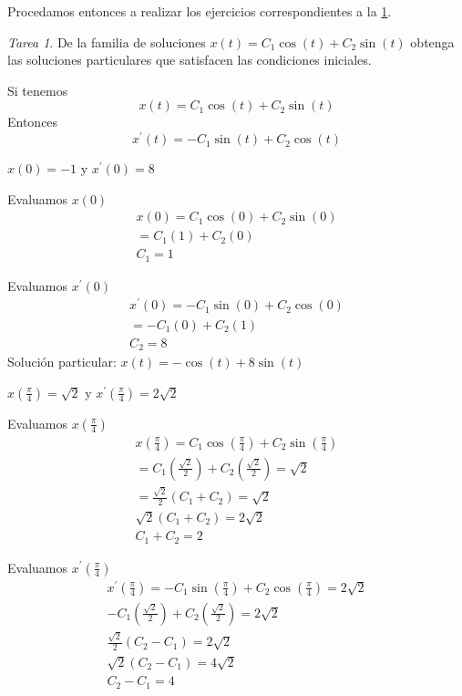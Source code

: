 \documentclass[12pt]{article} %
\theoremstyle{remark} %
\newtheorem{tarea}{Tarea}[section] %
\newcounter{ejercicio}[tarea]
\begin{document}
Procedamos entonces a realizar los ejercicios correspondientes a la \cref{tarea:familiaSoluciones}.
\begin{tarea}\label{tarea:familiaSoluciones}
De la familia de soluciones $x(t) = C_1 \cos(t) + C_2 \sin(t)$ obtenga las 
soluciones particulares que satisfacen las condiciones iniciales.

Si tenemos \[ x(t) = C_1 \cos(t) + C_2 \sin(t) \]
Entonces \[ x^{\prime}(t) = -C_1 \sin(t) + C_2 \cos(t) \]
\begin{ejercicio}
  $x(0) = -1$ y $x^{\prime}(0) = 8$

  Evaluamos $x(0)$
  \begin{gather*}
    x(0) = C_1 \cos(0) + C_2 \sin(0)\\[0.5em]
    = C_1(1) + C_2(0)\\[0.5em]
    C_1  = 1
  \end{gather*}

  Evaluamos $x^{\prime}(0)$
  \begin{gather*}
    x^{\prime}(0) = -C_1 \sin(0) + C_2 \cos(0)\\[0.5em]
    = -C_1(0) + C_2(1)\\[0.5em]
    C_2 = 8
  \end{gather*}
  Solución particular: $x(t) = - \cos(t) + 8 \sin(t)$

\end{ejercicio}
\begin{ejercicio}
  $x(\frac{\pi}{4}) = \sqrt{2}$ y $x^{\prime}(\frac{\pi}{4}) = 2 \sqrt{2}$

  Evaluamos $x(\frac{\pi}{4})$
  \begin{gather*}
    x(\frac{\pi}{4}) = C_1 \cos(\frac{\pi}{4}) + C_2 \sin(\frac{\pi}{4})\\[0.5em]
    = C_1 (\frac{\sqrt{2}}{2}) + C_2 (\frac{\sqrt{2}}{2}) = \sqrt{2}\\[0.5em]
    = \frac{\sqrt{2}}{2}(C_1 + C_2) = \sqrt{2}\\[0.5em]
    \sqrt{2}(C_1 + C_2) = 2 \sqrt{2}\\[0.5em]
    C_1 + C_2 = 2
  \end{gather*}

  Evaluamos $x^{\prime}(\frac{\pi}{4})$
  \begin{gather*}
    x^{\prime}(\frac{\pi}{4}) = -C_1 \sin(\frac{\pi}{4}) + C_2 \cos(\frac{\pi}{4}) = 2 \sqrt{2}\\[0.5em]
    -C_1 (\frac{\sqrt{2}}{2}) + C_2 (\frac{\sqrt{2}}{2}) = 2 \sqrt{2}\\[0.5em]
    \frac{\sqrt{2}}{2}(C_2 - C_1) = 2 \sqrt{2}\\[0.5em]
    \sqrt{2}(C_2 - C_1) = 4 \sqrt{2}\\[0.5em]
    C_2 - C_1 = 4
  \end{gather*}


\end{ejercicio}
\end{tarea}
\end{document}
